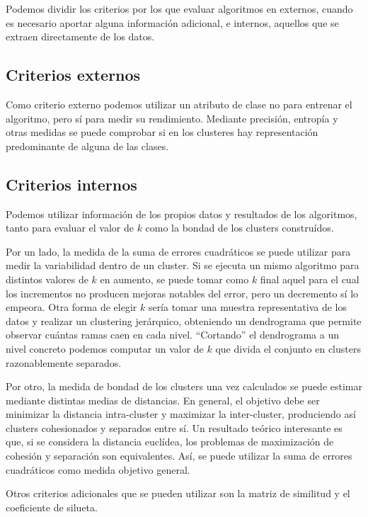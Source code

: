 \documentclass[a4paper,11pt,spanish]{report}
\let\stdsub\subsection
\let\stdsubsub\subsubsection
\renewcommand{\section}{\stdsub}
\renewcommand{\subsection}{\stdsubsub}
\begin{document}
Podemos dividir los criterios por los que evaluar algoritmos en externos, cuando es necesario aportar alguna información adicional, e internos, aquellos que se extraen directamente de los datos.

\section{Criterios externos}
\label{sec-1-4-1}

Como criterio externo podemos utilizar un atributo de clase no para entrenar el algoritmo, pero sí para medir su rendimiento. Mediante precisión, entropía y otras medidas se puede comprobar si en los clusteres hay representación predominante de alguna de las clases.

\section{Criterios internos}
\label{sec-1-4-2}

Podemos utilizar información de los propios datos y resultados de los algoritmos, tanto para evaluar el valor de $k$ como la bondad de los clusters construídos. 

Por un lado, la medida de la suma de errores cuadráticos se puede utilizar para medir la variabilidad dentro de un cluster. Si se ejecuta un mismo algoritmo para distintos valores de $k$ en aumento, se puede tomar como $k$ final aquel para el cual los incrementos no producen mejoras notables del error, pero un decremento sí lo empeora. Otra forma de elegir $k$ sería tomar una muestra representativa de los datos y realizar un clustering jerárquico, obteniendo un dendrograma que permite observar cuántas ramas caen en cada nivel. ``Cortando'' el dendrograma a un nivel concreto podemos computar un valor de $k$ que divida el conjunto en clusters razonablemente separados.

Por otro, la medida de bondad de los clusters una vez calculados se puede estimar mediante distintas medias de distancias. En general, el objetivo debe ser minimizar la distancia intra-cluster y maximizar la inter-cluster, produciendo así clusters cohesionados y separados entre sí. Un resultado teórico interesante es que, si se considera la distancia euclídea, los problemas de maximización de cohesión y separación son equivalentes. Así, se puede utilizar la suma de errores cuadráticos como medida objetivo general.

Otros criterios adicionales que se pueden utilizar son la matriz de similitud y el coeficiente de silueta.
\end{document}
